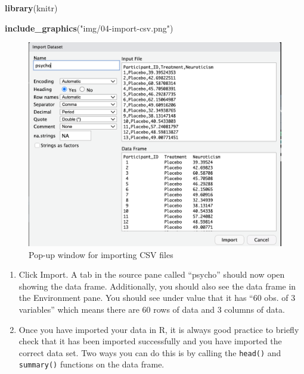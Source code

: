 \documentclass[
]{book}
\newenvironment{Shaded}{\begin{snugshade}}{\end{snugshade}}
\newcommand{\FunctionTok}[1]{\textcolor[rgb]{0.13,0.29,0.53}{\textbf{#1}}}
\newcommand{\NormalTok}[1]{#1}
\newcommand{\StringTok}[1]{\textcolor[rgb]{0.31,0.60,0.02}{#1}}
\providecommand{\tightlist}{%
  \setlength{\itemsep}{0pt}\setlength{\parskip}{0pt}}
\begin{document}
\begin{Shaded}
\begin{Highlighting}[]
\FunctionTok{library}\NormalTok{(knitr)}

\FunctionTok{include\_graphics}\NormalTok{(}\StringTok{"img/04{-}import{-}csv.png"}\NormalTok{)}
\end{Highlighting}
\end{Shaded}

\begin{figure}
\centering
\includegraphics{img/04-import-csv.png}
\caption{\label{fig:unnamed-chunk-159}Pop-up window for importing CSV files}
\end{figure}

\begin{enumerate}
\def\labelenumi{\arabic{enumi}.}
\setcounter{enumi}{7}
\tightlist
\item
  Click Import. A tab in the source pane called ``psycho'' should now open showing the data frame. Additionally, you should also see the data frame in the Environment pane. You should see under value that it has ``60 obs. of 3 variables'' which means there are 60 rows of data and 3 columns of data.
\item
  Once you have imported your data in R, it is always good practice to briefly check that it has been imported successfully and you have imported the correct data set. Two ways you can do this is by calling the \texttt{head()} and \texttt{summary()} functions on the data frame.
\end{enumerate}
\end{document}
